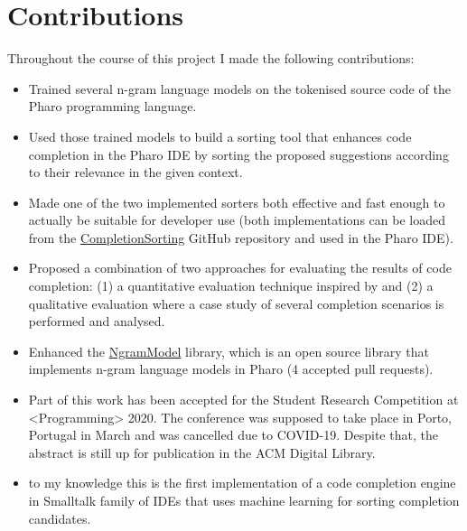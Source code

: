 \section{Contributions}
\label{sec:Introduction-Contributions}
Throughout the course of this project I made the following contributions:
\begin{itemize}
    \item Trained several n-gram language models on the tokenised source code of the Pharo programming language.
    \item Used those trained models to build a sorting tool that enhances code completion in the Pharo IDE by sorting the proposed suggestions according to their relevance in the given context.
    \item Made one of the two implemented sorters both effective and fast enough to actually be suitable for developer use (both implementations can be loaded from the \href{https://github.com/myroslavarm/CompletionSorting}{CompletionSorting} GitHub repository and used in the Pharo IDE).
    \item Proposed a combination of two approaches for evaluating the results of code completion: (1) a quantitative evaluation technique inspired by \cite{Robb08a} and (2) a qualitative evaluation where a case study of several completion scenarios is performed and analysed.
    \item Enhanced the \href{https://github.com/pharo-ai/NgramModel}{NgramModel} library, which is an open source library that implements n-gram language models in Pharo (4 accepted pull requests). 
    \item Part of this work has been accepted for the Student Research Competition at <Programming> 2020. The conference was supposed to take place in Porto, Portugal in March and was cancelled due to COVID-19. Despite that, the abstract is still up for publication in the ACM Digital Library.
    \item {} to my knowledge\insertion{,} this is the first implementation of a code completion engine in Smalltalk family of IDEs that uses machine learning for sorting completion candidates.
\end{itemize}

